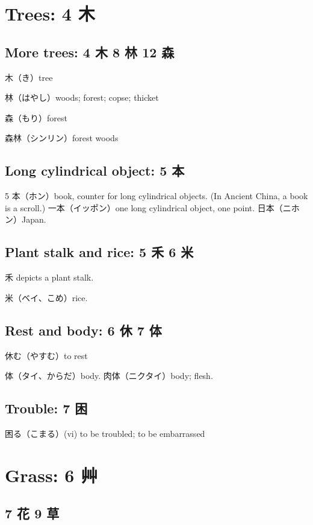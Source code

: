 \section{Trees: 4 木}

\subsection{More trees: 4 木 8 林 12 森}

木（き）tree

林（はやし）woods; forest; copse; thicket

森（もり）forest

森林（シンリン）forest woods

\subsection{Long cylindrical object: 5 本}

5 本（ホン）book, counter for long cylindrical objects.
(In Ancient China, a book is a scroll.)
一本（イッポン）one long cylindrical object, one point.
日本（ニホン）Japan.

\subsection{Plant stalk and rice: 5 禾 6 米}

禾 depicts a plant stalk.

米（ベイ、こめ）rice.

\subsection{Rest and body: 6 休 7 体}

休む（やすむ）to rest

体（タイ、からだ）body.
肉体（ニクタイ）body; flesh.

\subsection{Trouble: 7 困}

困る（こまる）(vi) to be troubled; to be embarrassed

\section{Grass: 6 艸}

\subsection{7 花 9 草}

